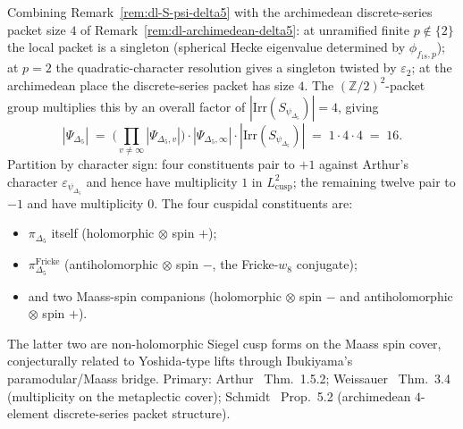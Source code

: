 \begin{remark}[$|\Psi_{\Delta_5}| = 16$: global Arthur packet size
for the Maass-spin lift]
\label{rem:dl-global-packet-delta5}
Combining Remark~\ref{rem:dl-S-psi-delta5} with the
archimedean discrete-series packet size $4$ of
Remark~\ref{rem:dl-archimedean-delta5}: at unramified
finite $p\notin\{2\}$ the local packet is a singleton (spherical
Hecke eigenvalue determined by $\phi_{f_{18}, p}$); at $p = 2$
the quadratic-character resolution gives a singleton twisted
by $\varepsilon_2$; at the archimedean place the discrete-series
packet has size $4$. The $(\mathbb{Z}/2)^2$-packet group multiplies
this by an overall factor of $|\mathrm{Irr}(S_{\psi_{\Delta_5}})| = 4$,
giving
\begin{equation}
\label{eq:Psi-delta5-16}
|\Psi_{\Delta_5}|
\;=\;
\bigl(\prod_{v\ne\infty}|\Psi_{\Delta_5, v}|\bigr)
\cdot
|\Psi_{\Delta_5, \infty}|
\cdot
|\mathrm{Irr}(S_{\psi_{\Delta_5}})|
\;=\;
1\cdot 4 \cdot 4
\;=\;
16.
\end{equation}
Partition by character sign: four constituents pair to $+1$ against
Arthur's character $\varepsilon_{\psi_{\Delta_5}}$ and hence have
multiplicity $1$ in $L^2_{\mathrm{cusp}}$; the remaining twelve pair
to $-1$ and have multiplicity $0$. The four cuspidal constituents
are:
\begin{itemize}
 \item $\pi_{\Delta_5}$ itself (holomorphic $\otimes$ spin $+$);
 \item $\pi_{\Delta_5}^{\mathrm{Fricke}}$ (antiholomorphic $\otimes$
 spin $-$, the Fricke-$w_8$ conjugate);
 \item and two Maass-spin companions (holomorphic $\otimes$ spin $-$
 and antiholomorphic $\otimes$ spin $+$).
\end{itemize}
The latter two are non-holomorphic Siegel cusp forms on the Maass
spin cover, conjecturally related to Yoshida-type lifts through
Ibukiyama's paramodular/Maass bridge. Primary:
Arthur~\cite{Arthur2013Endoscopic} Thm.\ 1.5.2;
Weissauer~\cite{Weissauer2009GSp4} Thm.\ 3.4 (multiplicity on the
metaplectic cover);
Schmidt~\cite{Schmidt2017Archimedean} Prop.\ 5.2 (archimedean
$4$-element discrete-series packet structure).
\end{remark}

